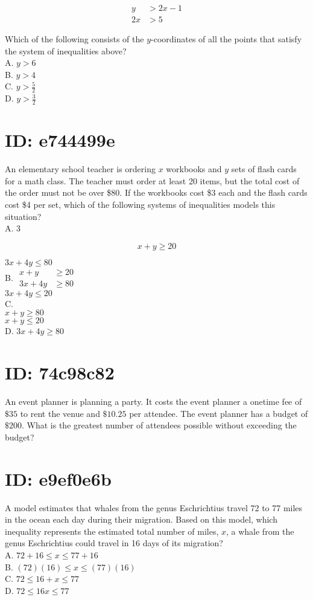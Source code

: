 $$
\begin{aligned}
y & >2 x-1 \\
2 x & >5
\end{aligned}
$$

Which of the following consists of the $y$-coordinates of all the points that satisfy the system of inequalities above?\\
A. $y>6$\\
B. $y>4$\\
C. $y>\frac{5}{2}$\\
D. $y>\frac{3}{2}$

\section*{ID: e744499e}
An elementary school teacher is ordering $x$ workbooks and $y$ sets of flash cards for a math class. The teacher must order at least 20 items, but the total cost of the order must not be over \$80. If the workbooks cost \$3 each and the flash cards cost \$4 per set, which of the following systems of inequalities models this situation?\\
A. 3

$$
x+y \geq 20
$$

$3 x+4 y \leq 80$\\
B. $\begin{aligned} x+y & \geq 20 \\ 3 x+4 y & \geq 80\end{aligned}$\\
$3 x+4 y \leq 20$\\
C.\\
$x+y \geq 80$\\
$x+y \leq 20$\\
D. $3 x+4 y \geq 80$

\section*{ID: 74c98c82}
An event planner is planning a party. It costs the event planner a onetime fee of $\$ 35$ to rent the venue and $\$ 10.25$ per attendee. The event planner has a budget of $\$ 200$. What is the greatest number of attendees possible without exceeding the budget?

\section*{ID: e9ef0e6b}
A model estimates that whales from the genus Eschrichtius travel 72 to 77 miles in the ocean each day during their migration. Based on this model, which inequality represents the estimated total number of miles, $x$, a whale from the genus Eschrichtius could travel in 16 days of its migration?\\
A. $72+16 \leq x \leq 77+16$\\
B. $(72)(16) \leq x \leq(77)(16)$\\
C. $72 \leq 16+x \leq 77$\\
D. $72 \leq 16 x \leq 77$

